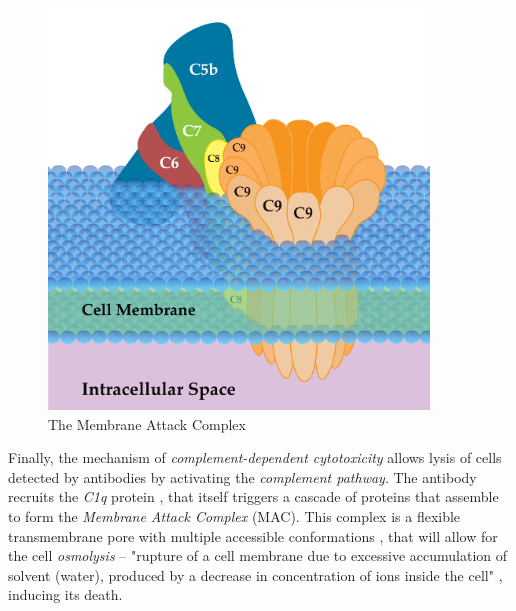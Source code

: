\begin{figure}[H]
\begin{minipage}{0.49\textwidth}
        \includegraphics[width=0.9\textwidth]{../Images/Membrane_Attack_Complex.png}   
        \caption{The Membrane Attack Complex}
        \label{fig:MAC}
    \end{minipage}
\end{figure}

Finally, the mechanism of \emph{complement-dependent cytotoxicity} allows
lysis of cells detected by antibodies by activating the \emph{complement pathway}.
The antibody recruits the \emph{C1q} protein \cite{charles_a_janeway_complement_2001}
\cite{courtois_complement_2012}, that itself triggers a cascade
of proteins that assemble to form the \emph{Membrane Attack Complex} (MAC).
This complex is a flexible transmembrane pore with multiple 
accessible conformations \cite{xie_complement_2020},
that will allow for the cell \emph{osmolysis} -- "rupture of a cell membrane
due to excessive accumulation of solvent (water), produced by
a decrease in concentration of ions inside the cell" \cite{gebhart_osmolysis_2013},
inducing its death.

\newpage
